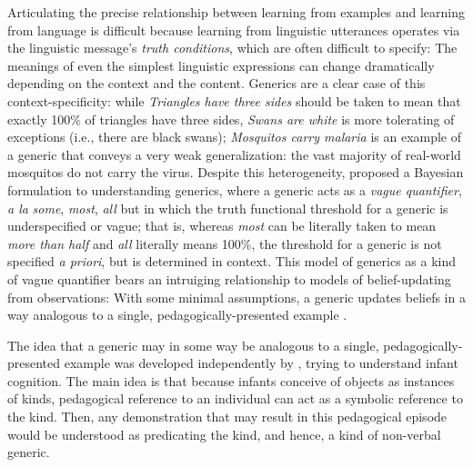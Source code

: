 \documentclass[10pt,letterpaper]{article}
\begin{document}
Articulating the precise relationship between learning from examples and learning from language is difficult because learning from linguistic utterances operates via the linguistic message's \emph{truth conditions}, which are often difficult to specify:
The meanings of even the simplest linguistic expressions can change dramatically depending on the context and the content. 
Generics are a clear case of this context-specificity:  while \emph{Triangles have three sides} should be taken to mean that exactly 100\% of triangles have three sides, \emph{Swans are white} is more tolerating of exceptions (i.e., there are black swans); \emph{Mosquitos carry malaria} is an example of a generic that conveys a very weak generalization: the vast majority of real-world mosquitos do not carry the virus. 
Despite this heterogeneity, \cite{Tessler2019psychrev} proposed a Bayesian formulation to understanding generics, where a generic acts as a \emph{vague quantifier}, \emph{a la} \emph{some}, \emph{most}, \emph{all} but in which the truth functional threshold for a generic is underspecified or vague; that is, whereas \emph{most} can be literally taken to mean \emph{more than half} and \emph{all} literally means 100\%, the threshold for a generic is not specified \emph{a priori}, but is determined in context.
This model of generics as a kind of vague quantifier bears an intruiging relationship to models of belief-updating from observations: With some minimal assumptions, a generic updates beliefs in a way analogous to a single, pedagogically-presented example \cite{Tessler2020genint}. 

The idea that a generic may in some way be analogous to a single, pedagogically-presented example was developed independently by  , trying to understand infant cognition. 
The main idea is that because infants conceive of objects as instances of kinds, pedagogical reference to an individual can act as a symbolic reference to the kind. 
Then, any demonstration that may result in this pedagogical episode would be understood as predicating the kind, and hence, a kind of non-verbal generic.
\end{document}
